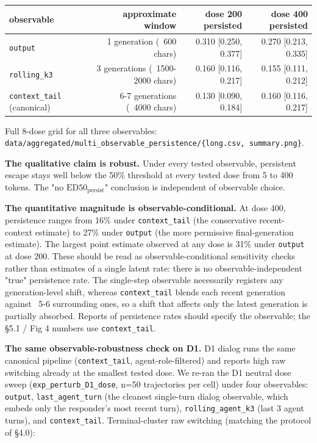 \documentclass{article}
\theoremstyle{plain}
\theoremstyle{definition}
\begin{document}
\begin{table}[h!]
\centering
\small
\begin{tabular}{lrrr}
\toprule
observable & approximate window & dose 200 persisted & dose 400 persisted \\
\midrule
\texttt{output} & 1 generation (~600 chars) & 0.310 [0.250, 0.377] & 0.270 [0.213, 0.335] \\
\texttt{rolling\_k3} & 3 generations (~1500-2000 chars) & 0.160 [0.116, 0.217] & 0.155 [0.111, 0.212] \\
\texttt{context\_tail} (canonical) & ~6-7 generations (~4000 chars) & 0.130 [0.090, 0.184] & 0.160 [0.116, 0.217] \\
\bottomrule
\end{tabular}
\end{table}

Full 8-dose grid for all three observables: \texttt{data/aggregated/multi\_observable\_persistence/\{long.csv, summary.png\}}.

\textbf{The qualitative claim is robust.} Under every tested observable, persistent escape stays well below the 50\% threshold at every tested dose from 5 to 400 tokens. The "no $\mathrm{ED50}_{\mathrm{persist}}$" conclusion is independent of observable choice.

\textbf{The quantitative magnitude is observable-conditional.} At dose 400, persistence ranges from 16\% under \texttt{context\_tail} (the conservative recent-context estimate) to 27\% under \texttt{output} (the more permissive final-generation estimate). The largest point estimate observed at any dose is 31\% under \texttt{output} at dose 200. These should be read as observable-conditional sensitivity checks rather than estimates of a single latent rate: there is no observable-independent "true" persistence rate. The single-step observable necessarily registers any generation-level shift, whereas \texttt{context\_tail} blends each recent generation against ~5-6 surrounding ones, so a shift that affects only the latest generation is partially absorbed. Reports of persistence rates should specify the observable; the §5.1 / Fig 4 numbers use \texttt{context\_tail}.

\textbf{The same observable-robustness check on D1.} D1 dialog runs the same canonical pipeline (\texttt{context\_tail}, agent-role-filtered) and reports high raw switching already at the smallest tested dose. We re-ran the D1 neutral dose sweep (\texttt{exp\_perturb\_D1\_dose}, n=50 trajectories per cell) under four observables: \texttt{output}, \texttt{last\_agent\_turn} (the cleanest single-turn dialog observable, which embeds only the responder's most recent turn), \texttt{rolling\_agent\_k3} (last 3 agent turns), and \texttt{context\_tail}. Terminal-cluster raw switching (matching the protocol of §4.0):
\end{document}

